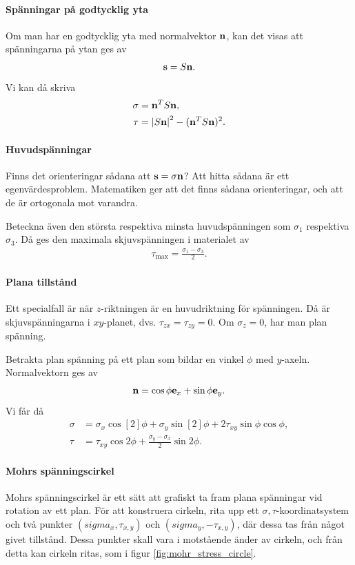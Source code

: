 \paragraph{Spänningar på godtycklig yta}
Om man har en godtycklig yta med normalvektor $\vb{n}$, kan det visas att spänningarna på ytan ges av
\begin{align*}
	\vb{s} = S\vb{n}.
\end{align*}
Vi kan då skriva
\begin{align*}
	\sigma &= \vb{n}^{T}S\vb{n}, \\
	\tau   &= \abs{S\vb{n}}^{2} - (\vb{n}^{T}S\vb{n})^{2}.
\end{align*}

\paragraph{Huvudspänningar}
Finns det orienteringar sådana att $\vb{s} = \sigma\vb{n}$? Att hitta sådana är ett egenvärdesproblem. Matematiken ger att det finns sådana orienteringar, och att de är ortogonala mot varandra.

Beteckna även den största respektiva minsta huvudspänningen som $\sigma_{1}$ respektiva $\sigma_{3}$. Då ges den maximala skjuvspänningen i materialet av
\begin{align*}
	\tau_{\text{max}} = \frac{\sigma_{1} - \sigma_{3}}{2}.
\end{align*}

\paragraph{Plana tillstånd}
Ett specialfall är när $z$-riktningen är en huvudriktning för spänningen. Då är skjuvspänningarna i $xy$-planet, dvs. $\tau_{zx} = \tau_{zy} = 0$. Om $\sigma_{z} = 0$, har man plan spänning.

Betrakta plan spänning på ett plan som bildar en vinkel $\phi$ med $y$-axeln. Normalvektorn ges av
\begin{align*}
	\vb{n} = \cos{\phi}\vb{e}_{x} + \sin{\phi}\vb{e}_{y}.
\end{align*}
Vi får då
\begin{align*}
	\sigma &= \sigma_{x}\cos[2]{\phi} + \sigma_{y}\sin[2]{\phi} + 2\tau_{xy}\sin{\phi}\cos{\phi}, \\
	\tau   &= \tau_{xy}\cos{2\phi} + \frac{\sigma_{y} - \sigma_{x}}{2}\sin{2\phi}.
\end{align*}

\paragraph{Mohrs spänningscirkel}
Mohrs spänningscirkel är ett sätt att grafiskt ta fram plana spänningar vid rotation av ett plan. För att konstruera cirkeln, rita upp ett $\sigma, \tau$-koordinatsystem och två punkter $(sigma_{x}, \tau_{x, y})$ och $(sigma_{y}, -\tau_{x, y})$, där dessa tas från något givet tillstånd. Dessa punkter skall vara i motstående änder av cirkeln, och från detta kan cirkeln ritas, som i figur \ref{fig:mohr_stress_circle}.

